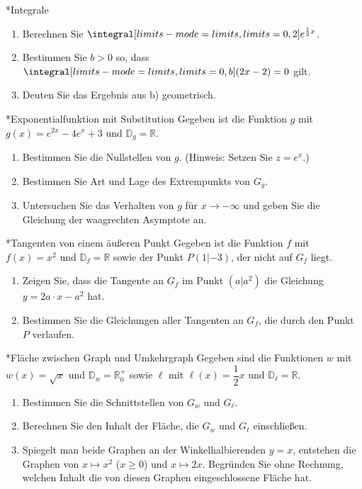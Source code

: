 \begin{uebung}*{Integrale}
\begin{enumerate}[label=\alph*)]
  \item Berechnen Sie $\integral[limits-mode=limits,limits={0, 2}]{e^{\frac{1}{2}x}}$.
  \item Bestimmen Sie $b>0$ so, dass $\integral[limits-mode=limits,limits={0, b}]{(2x-2)} = 0$ gilt.
  \item Deuten Sie das Ergebnis aus b) geometrisch.
\end{enumerate}
\end{uebung}

\begin{uebung}*{Exponentialfunktion mit Substitution}
Gegeben ist die Funktion $g$ mit $g(x) = e^{2x}-4e^x+3$ und $\mathds{D}_g = \mathds{R}$.
\begin{enumerate}[label=\alph*)]
  \item Bestimmen Sie die Nullstellen von $g$. (Hinweis: Setzen Sie $z = e^x$.)
  \item Bestimmen Sie Art und Lage des Extrempunkts von $G_g$.
  \item Untersuchen Sie das Verhalten von $g$ für $x\longrightarrow-\infty$ und geben Sie die Gleichung der waagrechten Asymptote an.
\end{enumerate}
\end{uebung}

\begin{uebung}*{Tangenten von einem äußeren Punkt}
Gegeben ist die Funktion $f$ mit $f(x) = x^2$ und $\mathds{D}_f = \mathds{R}$ sowie der Punkt $P(1|-3)$, der nicht auf $G_f$ liegt.
\begin{enumerate}[label=\alph*)]
  \item Zeigen Sie, dass die Tangente an $G_f$ im Punkt $(a|a^2)$ die Gleichung $y = 2a\cdot x-a^2$ hat.
  \item Bestimmen Sie die Gleichungen aller Tangenten an $G_f$, die durch den Punkt $P$ verlaufen.
\end{enumerate}
\end{uebung}

\begin{uebung}*{Fläche zwischen Graph und Umkehrgraph}
Gegeben sind die Funktionen $w$ mit $w(x) = \sqrt{x}$ und $\mathds{D}_w = \mathds{R}_0^+$ sowie $\ell$ mit $\ell(x) = \dfrac{1}{2}x$ und $\mathds{D}_\ell = \mathds{R}$.
\begin{enumerate}[label=\alph*)]
  \item Bestimmen Sie die Schnittstellen von $G_w$ und $G_\ell$.
  \item Berechnen Sie den Inhalt der Fläche, die $G_w$ und $G_\ell$ einschließen.
  \item Spiegelt man beide Graphen an der Winkelhalbierenden $y=x$, entstehen die Graphen von $x\mapsto x^2$ ($x\geq 0$) und $x\mapsto 2x$. Begründen Sie ohne Rechnung, welchen Inhalt die von diesen Graphen eingeschlossene Fläche hat.
\end{enumerate}
\end{uebung}

